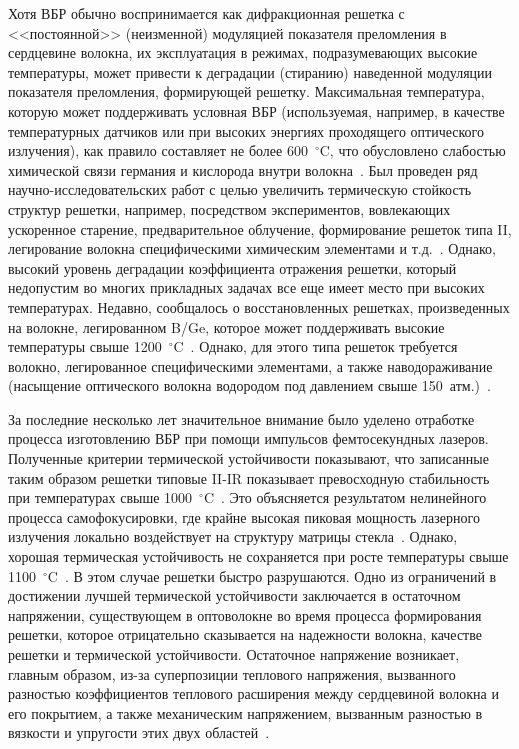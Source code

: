 Хотя ВБР обычно воспринимается как дифракционная решетка с <<постоянной>> (неизменной) модуляцией показателя преломления в сердцевине волокна, их эксплуатация в режимах, подразумевающих высокие температуры, может привести к деградации (стиранию) наведенной модуляции показателя преломления, формирующей решетку. Максимальная температура, которую может поддерживать условная ВБР (используемая, например, в качестве температурных датчиков или при высоких энергиях проходящего оптического излучения), как правило составляет не более 600~$^\circ$C, что обусловлено слабостью химической связи германия и кислорода внутри волокна~\cite{into_fbg_4}. Был проведен ряд научно-исследовательских работ с целью увеличить термическую стойкость структур решетки, например, посредством экспериментов, вовлекающих ускоренное старение, предварительное облучение, формирование решеток типа II, легирование волокна специфическими химическим элементами и т.д.~\cite{into_fbg_5,into_fbg_6,into_fbg_7,into_fbg_8,into_fbg_9}. Однако, высокий уровень деградации коэффициента отражения решетки, который недопустим во многих прикладных задачах все еще имеет место при высоких температурах. Недавно, сообщалось о восстановленных решетках, произведенных на волокне, легированном B/Ge, которое может поддерживать высокие температуры свыше 1200~$^\circ$C~\cite{into_fbg_10,into_fbg_11}. Однако, для этого типа решеток требуется волокно, легированное специфическими элементами, а также наводораживание (насыщение оптического волокна водородом под давлением свыше 150~атм.)~\cite{into_fbg_10}.

За последние несколько лет значительное внимание было уделено отработке процесса изготовлению ВБР при помощи импульсов фемтосекундных лазеров. Полученные критерии термической устойчивости показывают, что записанные таким образом решетки типовые II-IR показывает превосходную стабильность при температурах свыше 1000~$^\circ$C~\cite{into_fbg_12,into_fbg_13}. Это объясняется результатом нелинейного процесса самофокусировки, где крайне высокая пиковая мощность лазерного излучения локально воздействует на структуру матрицы стекла~\cite{into_fbg_2,into_fbg_14}. Однако, хорошая термическая устойчивость не сохраняется при росте температуры свыше 1100~$^\circ$C~\cite{into_fbg_12,into_fbg_13}. В этом случае решетки быстро разрушаются. Одно из ограничений в достижении лучшей термической устойчивости заключается в остаточном напряжении, существующем в оптоволокне во время процесса формирования решетки, которое отрицательно сказывается на надежности волокна, качестве решетки и термической устойчивости. Остаточное напряжение возникает, главным образом, из-за суперпозиции теплового напряжения, вызванного разностью коэффициентов теплового расширения между сердцевиной волокна и его покрытием, а также механическим напряжением, вызванным разностью в вязкости и упругости этих двух областей~\cite{into_fbg_15}.

